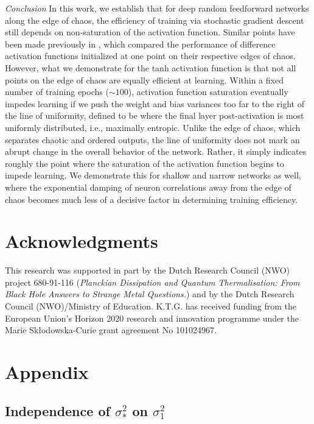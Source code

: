 \emph{Conclusion} 
In this work, we establish that for deep random feedforward networks along the edge of chaos, the efficiency of training via stochastic gradient descent still depends on non-saturation of the activation function. Similar points have been made previously in \cite{2018arXiv180508266H,pmlr-v97-hayou19a}, which compared the performance of difference activation functions initialized at one point on their respective edges of chaos. However, what we demonstrate for the tanh activation function is that not all points on the edge of chaos are equally efficient at learning. Within a fixed number of training epochs ($\sim 100$), activation function saturation eventually impedes learning if we push the weight and bias variances too far to the right of the line of uniformity, defined to be where the final layer post-activation is most uniformly distributed, i.e., maximally entropic. Unlike the edge of chaos, which separates chaotic and ordered outputs, the line of uniformity does not mark an abrupt change in the overall behavior of the network. Rather, it simply indicates roughly the point where the saturation of the activation function begins to impede learning. We demonstrate this for shallow and narrow networks as well, where the exponential damping of neuron correlations away from the edge of chaos becomes much less of a decisive factor in determining training efficiency.

\section*{Acknowledgments}
This research was supported 
in part by the Dutch Research Council
(NWO) project 680-91-116 ({\em Planckian Dissipation and Quantum Thermalisation: From
	Black Hole Answers to Strange Metal Questions.}) and
by the Dutch Research
Council (NWO)/Ministry of Education. K.T.G. has received funding from the European Union’s Horizon 2020 research and innovation programme under the Marie Sk\l odowska-Curie grant agreement No 101024967.

\newpage
\section{Appendix}
\subsection{Independence of \texorpdfstring{$\sigma_{*}^{2}$}{sigmastarsquared} on \texorpdfstring{$\sigma_{1}^{2}$}{sigmaonesquared}}
\label{app:postevol}

